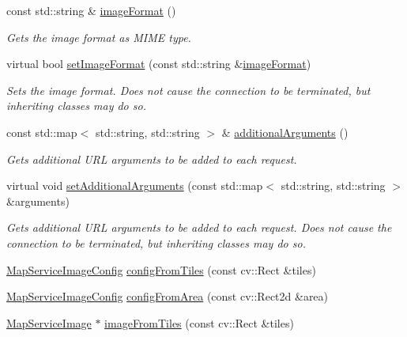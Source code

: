 \begin{DoxyCompactItemize}
const std\+::string \& \hyperlink{group___imagery_module_ga847bc79084bf9856525ce04240a24428}{image\+Format} ()
\begin{DoxyCompactList}\small\item\em Gets the image format as M\+I\+ME type. \end{DoxyCompactList}\item 
virtual bool \hyperlink{group___imagery_module_ga9c0fa65750aaf5c860f046eccf6f0fe7}{set\+Image\+Format} (const std\+::string \&\hyperlink{group___imagery_module_ga847bc79084bf9856525ce04240a24428}{image\+Format})
\begin{DoxyCompactList}\small\item\em Sets the image format. Does not cause the connection to be terminated, but inheriting classes may do so. \end{DoxyCompactList}\item 
const std\+::map$<$ std\+::string, std\+::string $>$ \& \hyperlink{group___imagery_module_gae806d1f279ef82bd45c8375e96936836}{additional\+Arguments} ()
\begin{DoxyCompactList}\small\item\em Gets additional U\+RL arguments to be added to each request. \end{DoxyCompactList}\item 
virtual void \hyperlink{group___imagery_module_gac4ab75cb614415087330a2bc36b3a8d7}{set\+Additional\+Arguments} (const std\+::map$<$ std\+::string, std\+::string $>$ \&arguments)
\begin{DoxyCompactList}\small\item\em Gets additional U\+RL arguments to be added to each request. Does not cause the connection to be terminated, but inheriting classes may do so. \end{DoxyCompactList}\item 
\hyperlink{structdg_1_1deepcore_1_1imagery_1_1_map_service_image_config}{Map\+Service\+Image\+Config} \hyperlink{classdg_1_1deepcore_1_1imagery_1_1_map_service_client_a9435311817f328944a05f6d9c6e2bfc3}{config\+From\+Tiles} (const cv\+::\+Rect \&tiles)
\item 
\hyperlink{structdg_1_1deepcore_1_1imagery_1_1_map_service_image_config}{Map\+Service\+Image\+Config} \hyperlink{classdg_1_1deepcore_1_1imagery_1_1_map_service_client_a2d0e5d751822be87f5acfd1c0922eb0f}{config\+From\+Area} (const cv\+::\+Rect2d \&area)
\item 
\hyperlink{classdg_1_1deepcore_1_1imagery_1_1_map_service_image}{Map\+Service\+Image} $\ast$ \hyperlink{classdg_1_1deepcore_1_1imagery_1_1_map_service_client_a7b3a391a6c5bdf5752a8c698153fa982}{image\+From\+Tiles} (const cv\+::\+Rect \&tiles)

\end{DoxyCompactItemize}

